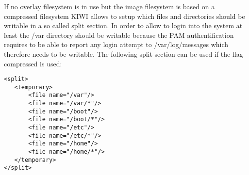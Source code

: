 If no overlay filesystem is in use but the image filesystem is based on
a compressed filesystem KIWI allows to setup which files and directories
should be writable in a so called split section. In order to allow to
login into the system at least the /var directory should be writable
because the PAM authentification requires to be able to report any login
attempt to /var/log/messages which therefore needs to be writable. The
following split section can be used if the flag compressed
is used:  

\begin{Command}{12cm}
\begin{verbatim}
<split>
   <temporary>
       <file name="/var"/>
       <file name="/var/*"/>
       <file name="/boot"/>
       <file name="/boot/*"/>
       <file name="/etc"/>
       <file name="/etc/*"/>
       <file name="/home"/>
       <file name="/home/*"/>
   </temporary>
</split>
\end{verbatim}
\end{Command}
